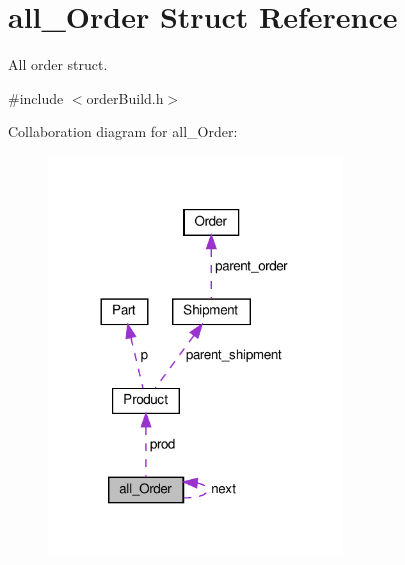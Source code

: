 \hypertarget{structall__Order}{}\section{all\+\_\+\+Order Struct Reference}
\label{structall__Order}


All order struct.  




{\ttfamily \#include $<$order\+Build.\+h$>$}



Collaboration diagram for all\+\_\+\+Order\+:\nopagebreak
\begin{figure}[H]
\begin{center}
\leavevmode
\includegraphics[width=221pt]{structall__Order__coll__graph}
\end{center}
\end{figure}
